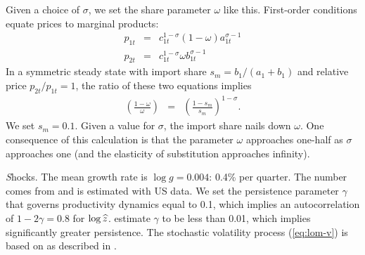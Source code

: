Given a choice of $\sigma$, we set the share parameter $\omega$ like this.
First-order conditions equate prices to marginal products:
\begin{eqnarray*}
    p_{1t} &=& c_{1t}^{1-\sigma} (1-\omega) a_{1t}^{\sigma-1} \\
    p_{2t} &=& c_{1t}^{1-\sigma} \omega b_{1t}^{\sigma-1}
\end{eqnarray*}
In a symmetric steady state with import share $s_m = b_1/(a_1 + b_1)$
and relative price $ p_{2t}/p_{1t} = 1$,
the ratio of these two equations implies
\begin{eqnarray}
    \left( \frac{1-\omega}{\omega} \right) &=& \left( \frac{1-s_m}{s_m} \right)^{1-\sigma} .
    \label{eq:share-calculation}
\end{eqnarray}
We set $s_m = 0.1$.  Given a value for $\sigma$, the import share nails down $\omega$.
One consequence of this calculation is that the parameter $\omega$ approaches one-half
as $\sigma$ approaches one (and the elasticity of substitution approaches infinity).


{\textit Shocks.}
The mean growth rate is $\log g = 0.004 $:  0.4\% per quarter.
The number comes from \citet[Table 4]{Tallarini2000-xx} and is estimated with US data.
We set the persistence parameter $\gamma$ that governs productivity dynamics equal to 0.1,
which implies an autocorrelation of $1-2\gamma = 0.8$ for $\log \widehat{z}$.
\citet[Table 5]{Rabanal2011-pm} estimate $\gamma$ to be less
than 0.01, which implies significantly greater persistence.
The stochastic volatility process (\ref{eq:lom-v}) is based on \citet{Jurado2015-hy}
as described in \citet[Section 5.3]{Backus2015-yx}.
